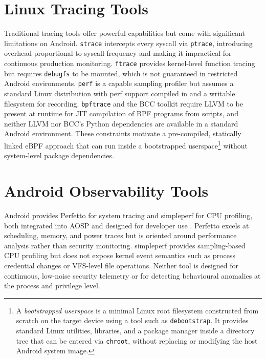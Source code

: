 \documentclass{mnitjaipur}
\begin{document}
\section{Linux Tracing Tools}
Traditional tracing tools offer powerful capabilities but come with significant limitations on Android. \texttt{strace} intercepts every syscall via \texttt{ptrace}, introducing overhead proportional to syscall frequency and making it impractical for continuous production monitoring. \texttt{ftrace} provides kernel-level function tracing but requires \texttt{debugfs} to be mounted, which is not guaranteed in restricted Android environments. \texttt{perf} is a capable sampling profiler but assumes a standard Linux distribution with perf support compiled in and a writable filesystem for recording. \texttt{bpftrace} and the BCC toolkit require LLVM to be present at runtime for JIT compilation of BPF programs from scripts, and neither LLVM nor BCC's Python dependencies are available in a standard Android environment.\cite{strace_doc,ftrace_doc,perf_doc,bpftrace_doc} These constraints motivate a pre-compiled, statically linked eBPF approach that can run inside a bootstrapped userspace\footnote{A \emph{bootstrapped userspace} is a minimal Linux root filesystem constructed from scratch on the target device using a tool such as \texttt{debootstrap}. It provides standard Linux utilities, libraries, and a package manager inside a directory tree that can be entered via \texttt{chroot}, without replacing or modifying the host Android system image.} without system-level package dependencies.

\section{Android Observability Tools}
Android provides Perfetto for system tracing and simpleperf for CPU profiling, both integrated into AOSP and designed for developer use \cite{android_perfetto, android_simpleperf, androidkernel2020}. Perfetto excels at scheduling, memory, and power traces but is oriented around performance analysis rather than security monitoring. simpleperf provides sampling-based CPU profiling but does not expose kernel event semantics such as process credential changes or VFS-level file operations. Neither tool is designed for continuous, low-noise security telemetry or for detecting behavioural anomalies at the process and privilege level.
\end{document}

